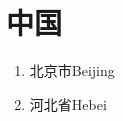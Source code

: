 \documentclass{article}
\begin{document}
\section*{中国}
\begin{enumerate}
\item 北京市Beijing
\\[5\baselineskip]
\item 河北省Hebei

\end{enumerate}
\end{document}
